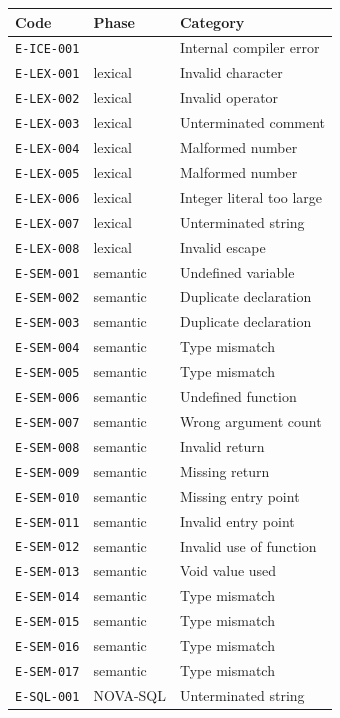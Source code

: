 \begin{longtable}{@{}llp{}@{}}\toprule
\textbf{Code} & \textbf{Phase} & \textbf{Category}\\ \midrule\endhead
\texttt{E-ICE-001} &  & Internal compiler error\\
\texttt{E-LEX-001} & lexical & Invalid character\\
\texttt{E-LEX-002} & lexical & Invalid operator\\
\texttt{E-LEX-003} & lexical & Unterminated comment\\
\texttt{E-LEX-004} & lexical & Malformed number\\
\texttt{E-LEX-005} & lexical & Malformed number\\
\texttt{E-LEX-006} & lexical & Integer literal too large\\
\texttt{E-LEX-007} & lexical & Unterminated string\\
\texttt{E-LEX-008} & lexical & Invalid escape\\
\texttt{E-SEM-001} & semantic & Undefined variable\\
\texttt{E-SEM-002} & semantic & Duplicate declaration\\
\texttt{E-SEM-003} & semantic & Duplicate declaration\\
\texttt{E-SEM-004} & semantic & Type mismatch\\
\texttt{E-SEM-005} & semantic & Type mismatch\\
\texttt{E-SEM-006} & semantic & Undefined function\\
\texttt{E-SEM-007} & semantic & Wrong argument count\\
\texttt{E-SEM-008} & semantic & Invalid return\\
\texttt{E-SEM-009} & semantic & Missing return\\
\texttt{E-SEM-010} & semantic & Missing entry point\\
\texttt{E-SEM-011} & semantic & Invalid entry point\\
\texttt{E-SEM-012} & semantic & Invalid use of function\\
\texttt{E-SEM-013} & semantic & Void value used\\
\texttt{E-SEM-014} & semantic & Type mismatch\\
\texttt{E-SEM-015} & semantic & Type mismatch\\
\texttt{E-SEM-016} & semantic & Type mismatch\\
\texttt{E-SEM-017} & semantic & Type mismatch\\
\texttt{E-SQL-001} & NOVA-SQL & Unterminated string\\

\end{longtable}
